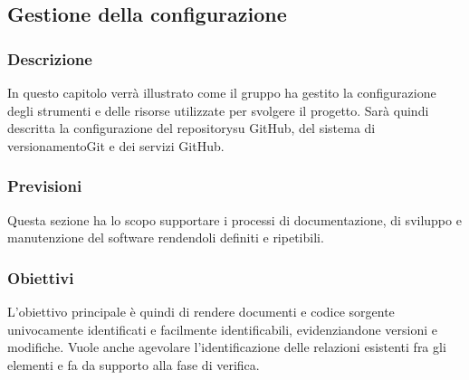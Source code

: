 \subsection{Gestione della configurazione}
	\subsubsection{Descrizione}
		In questo capitolo verrà illustrato come il gruppo ha gestito la configurazione degli strumenti e delle risorse utilizzate per svolgere il progetto\glo.
		Sarà quindi descritta la configurazione del repository\glosp su GitHub, del sistema di versionamento\glosp Git e dei servizi GitHub.
	\subsubsection{Previsioni}
		Questa sezione ha lo scopo supportare i processi di documentazione, di sviluppo e manutenzione del software rendendoli definiti e ripetibili.  
	\subsubsection{Obiettivi} 
		L'obiettivo principale è quindi di rendere documenti e codice sorgente univocamente identificati e facilmente identificabili, evidenziandone versioni e modifiche. Vuole anche agevolare l'identificazione delle relazioni esistenti fra gli elementi e fa da supporto alla fase di verifica.
